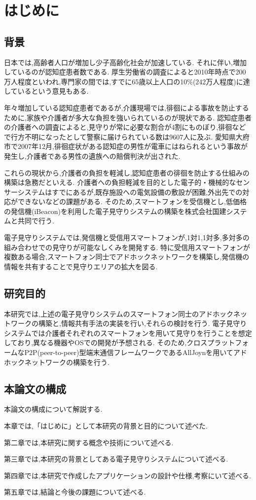 \chapter{はじめに}
\label{chap:introduction}

\section{背景}
日本では,高齢者人口が増加し少子高齢化社会が加速している.
それに伴い,増加しているのが認知症患者数である.
厚生労働省の調査\cite{厚生労働省}によると2010年時点で200万人程度といわれ,専門家の間では,すでに65歳以上人口の10\%(242万人程度)に達しているという意見もある.

年々増加している認知症患者であるが,介護現場では,徘徊による事故を防止するために,家族や介護者が多大な負担を強いられているのが現状である.
認知症患者の介護者への調査\cite{山梨県}によると,見守りが常に必要な割合が4割にものぼり,徘徊などで行方不明になったとして警察に届けられている数は9607人に及ぶ.
愛知県大府市で2007年12月,徘徊症状がある認知症の男性が電車にはねられるという事故が発生し,介護者である男性の遺族への賠償判決が出された.

これらの現状から,介護者の負担を軽減し,認知症患者の徘徊を防止する仕組みの構築は急務だといえる.
介護者への負担軽減を目的とした電子的・機械的なセンサーシステムはすでにあるが,既存施設への電気設備の敷設が困難,外出先での対応ができないなどの課題がある.
そのため,スマートフォンを受信機とし,低価格の発信機(iBeacon)を利用した電子見守りシステムの構築を株式会社国建システムと共同で行う.

電子見守りシステムでは,発信機と受信用スマートフォンが,1対1,1対多,多対多の組み合わせでの見守りが可能なしくみを開発する.
特に受信用スマートフォンが複数ある場合,スマートフォン同士でアドホックネットワークを構築し,発信機の情報を共有することで見守りエリアの拡大を図る.

\section{研究目的}
本研究では,上述の電子見守りシステムのスマートフォン同士のアドホックネットワークの構築と,情報共有手法の実装を行い,それらの検討を行う.
電子見守りシステムでは介護者それぞれのスマートフォンを用いて見守りを行うことを想定しており,異なる機器やOSでの開発が予想される.
そのため,クロスプラットフォームなP2P(peer-to-peer)型端末通信フレームワークであるAllJoynを用いてアドホックネットワークの構築を行う.

\section{本論文の構成}
本論文の構成について解説する.

本章では,「はじめに」として本研究の背景と目的について述べた.

第二章では,本研究に関する概念や技術について述べる.

第三章では,本研究の背景としてある電子見守りシステムについて述べる.

第四章では,本研究で作成したアプリケーションの設計や仕様,考察にいて述べる.

第五章では,結論と今後の課題について述べる.
